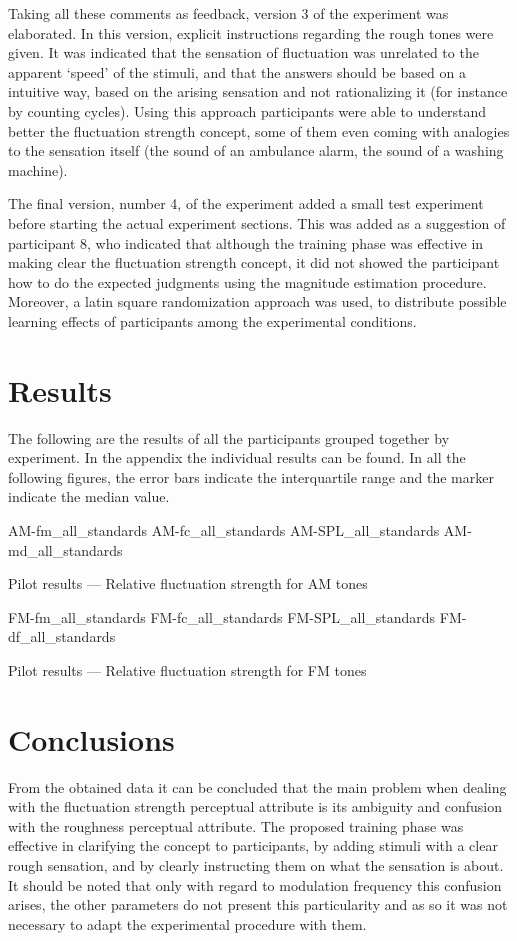 \documentclass[../main.tex]{subfiles}
\begin{document}
Taking all these comments as feedback, version 3 of the experiment was
elaborated. In this version, explicit instructions regarding the rough tones
were given. It was indicated that the sensation of fluctuation was unrelated to
the apparent `speed' of the stimuli, and that the answers should be based on a
intuitive way, based on the arising sensation and not rationalizing it (for
instance by counting cycles). Using this approach participants were able to
understand better the fluctuation strength concept, some of them even coming
with analogies to the sensation itself (the sound of an ambulance alarm, the
sound of a washing machine).

The final version, number 4, of the experiment added a small test experiment
before starting the actual experiment sections. This was added as a suggestion
of participant 8, who indicated that although the training phase was effective
in making clear the fluctuation strength concept, it did not showed the
participant how to do the expected judgments using the magnitude estimation
procedure. Moreover, a latin square randomization approach was used, to
distribute possible learning effects of participants among the experimental
conditions.

\section{Results}

The following are the results of all the participants grouped together by
experiment. In the appendix the individual results can be found. In all the
following figures, the error bars indicate the interquartile range and the
marker indicate the median value.

\begin{pilotresults}

\myfigurequad%
  {AM-fm_all_standards}
  {AM-fc_all_standards}
  {AM-SPL_all_standards}
  {AM-md_all_standards}
  {
    \caption{Pilot results --- Relative fluctuation strength for AM tones}
    \label{fig:pilot_AM_all_comparison}
  }

\myfigurequad%
  {FM-fm_all_standards}
  {FM-fc_all_standards}
  {FM-SPL_all_standards}
  {FM-df_all_standards}
  {
    \caption{Pilot results --- Relative fluctuation strength for FM tones}
    \label{fig:pilot_FM_all_comparison}
  }

\end{pilotresults}

\section{Conclusions}

From the obtained data it can be concluded that the main problem when dealing
with the fluctuation strength perceptual attribute is its ambiguity and
confusion with the roughness perceptual attribute. The proposed training phase
was effective in clarifying the concept to participants, by adding stimuli with
a clear rough sensation, and by clearly instructing them on what the sensation
is about. It should be noted that only with regard to modulation frequency this
confusion arises, the other parameters do not present this particularity and as
so it was not necessary to adapt the experimental procedure with them.
\end{document}
